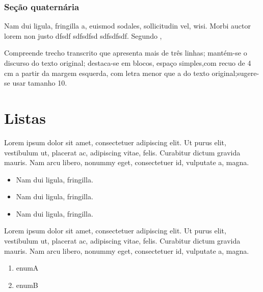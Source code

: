 \subsubsection{Seção quaternária}
Nam dui ligula, fringilla a, euismod sodales, sollicitudin vel, wisi. Morbi auctor lorem non justo dfsdf sdfsdfsd sdfsdfsdf.
\newpage %
Segundo  ,
\begin{citacao}
Compreende trecho transcrito que apresenta mais de três linhas; mantém-se o discurso do texto original; destaca-se em blocos, espaço simples,com recuo de 4 cm a partir da margem esquerda, com letra menor que a do texto original;sugere-se usar tamanho 10.
\end{citacao}

\lipsum[1-1]

\section {Listas}

Lorem ipsum dolor sit amet, consectetuer adipiscing elit. Ut purus elit, vestibulum ut, placerat ac, adipiscing vitae, felis. Curabitur dictum gravida mauris. Nam arcu libero, nonummy eget, consectetuer id, vulputate a, magna.

\begin{itemize}
\item Nam dui ligula, fringilla.
\item Nam dui ligula, fringilla.
\item Nam dui ligula, fringilla.
\end{itemize}

Lorem ipsum dolor sit amet, consectetuer adipiscing elit. Ut purus elit, vestibulum ut, placerat ac, adipiscing vitae, felis. Curabitur dictum gravida mauris. Nam arcu libero, nonummy eget, consectetuer id, vulputate a, magna.

\begin{enumerate}
 \item enumA
 \item enumB
\end{enumerate}
